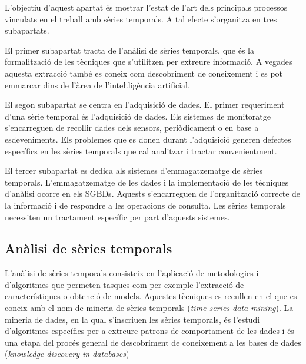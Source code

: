 L'objectiu d'aquest apartat és mostrar l'estat de l'art dels
principals processos vinculats en el treball amb sèries temporals. A
tal efecte s'organitza en tres subapartats.
 


El primer subapartat tracta de l'anàlisi de sèries temporals, que és
la formalització de les tècniques que s'utilitzen per extreure
informació. A vegades aquesta extracció també es coneix com
descobriment de coneixement i es pot emmarcar dins de l'àrea de
l'inte\l.ligència artificial.


El segon subapartat se centra en l'adquisició de dades. El primer
requeriment d'una sèrie temporal és l'adquisició de dades. Els
sistemes de monitoratge s'encarreguen de recollir dades dels sensors,
periòdicament o en base a esdeveniments.  Els problemes que es donen
durant l'adquisició generen defectes específics en les sèries
temporals que cal analitzar i tractar convenientment.


El tercer subapartat es dedica als sistemes d'emmagatzematge de sèries
temporals. L'emmagatzematge de les dades i la implementació de les
tècniques d'anàlisi ocorre en els \glspl{SGBD}. Aquests s'encarreguen
de l'organització correcte de la informació i de respondre a les
operacions de consulta. Les sèries temporals necessiten un tractament
específic per part d'aquests sistemes.



\subsection{Anàlisi de sèries temporals}




L'anàlisi de sèries temporals consisteix en l'aplicació de
metodologies i d'algoritmes que permeten tasques com per exemple
l'extracció de característiques o obtenció de models.  Aquestes
tècniques es recullen en el que es coneix amb el nom de mineria de
sèries temporals (\emph{time series data mining}). La mineria de
dades, en la qual s'inscriuen les sèries temporals, és l'estudi
d'algoritmes específics per a extreure patrons de comportament de les
dades i és una etapa del procés general de descobriment de
coneixement a les bases de dades (\emph{knowledge discovery in
  databases}) \parencite{fayyad96,last01}


